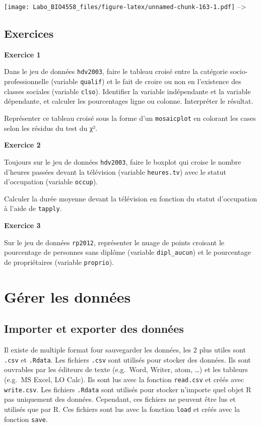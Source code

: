 \documentclass[
  12pt,
]{book}
\begin{document}
\texttt{[image: Labo\_BIO4558\_files/figure-latex/unnamed-chunk-163-1.pdf]}
--\textgreater{}

\hypertarget{ex-introR-biv}{%
\subsection{Exercices}\label{ex-introR-biv}}

\textbf{Exercice 1}

Dans le jeu de données \texttt{hdv2003}, faire le tableau croisé entre la catégorie socio-professionnelle (variable \texttt{qualif}) et le fait de croire ou non en l'existence des classes sociales (variable \texttt{clso}). Identifier la variable indépendante et la variable dépendante, et calculer les pourcentages ligne ou colonne. Interpréter le résultat.

Représenter ce tableau croisé sous la forme d'un \texttt{mosaicplot} en colorant les cases selon les résidus du test du χ².

\textbf{Exercice 2}

Toujours sur le jeu de données \texttt{hdv2003}, faire le boxplot qui croise le nombre d'heures passées devant la télévision (variable \texttt{heures.tv}) avec le statut d'occupation (variable \texttt{occup}).

Calculer la durée moyenne devant la télévision en fonction du statut d'occupation à l'aide de \texttt{tapply}.

\textbf{Exercice 3}

Sur le jeu de données \texttt{rp2012}, représenter le nuage de points croisant le pourcentage de personnes sans diplôme (variable \texttt{dipl\_aucun}) et le pourcentage de propriétaires (variable \texttt{proprio}).

\hypertarget{guxe9rer-les-donnuxe9es}{%
\section{Gérer les données}\label{guxe9rer-les-donnuxe9es}}

\hypertarget{importer-et-exporter-des-donnuxe9es}{%
\subsection{Importer et exporter des données}\label{importer-et-exporter-des-donnuxe9es}}

Il existe de multiple format four sauvegarder les données, les 2 plus utiles sont \texttt{.csv} et \texttt{.Rdata}.
Les fichiers \texttt{.csv} sont utilisés pour stocker des données.
Ils sont ouvrables par les éditeurs de texte (e.g.~Word, Writer, atom, \ldots) et les tableurs (e.g.~MS Excel, LO Calc).
Ils sont lus avec la fonction \texttt{read.csv} et créés avec \texttt{write.csv}.
Les fichiers \texttt{.Rdata} sont utilisés pour stocker n'importe quel objet R pas uniquement des données.
Cependant, ces fichiers ne peuvent être lus et utilisés que par R.
Ces fichiers sont lus avec la fonction \texttt{load} et créés avec la fonction \texttt{save}.
\end{document}
